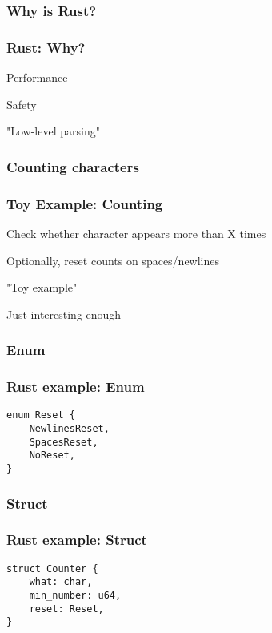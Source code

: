 \hypertarget{why-is-rust}{%
\subsubsection{Why is Rust?}\label{why-is-rust}}

\begin{frame}
\frametitle{Rust: Why?}

\pause

Performance \pause

Safety \pause

"Low-level parsing"

\end{frame}

\hypertarget{counting-characters}{%
\subsubsection{Counting characters}\label{counting-characters}}

\begin{frame}
\frametitle{Toy Example: Counting}

\pause

Check whether character appears more than X times \pause

Optionally, reset counts on spaces/newlines \pause

"Toy example" \pause

Just interesting enough

\end{frame}

\hypertarget{enum}{%
\subsubsection{Enum}\label{enum}}

\begin{frame}[fragile]
\frametitle{Rust example: Enum}

\begin{lstlisting}
enum Reset {
    NewlinesReset,
    SpacesReset,
    NoReset,
}
\end{lstlisting}
\end{frame}

\hypertarget{struct}{%
\subsubsection{Struct}\label{struct}}

\begin{frame}[fragile]
\frametitle{Rust example: Struct}

\begin{lstlisting}
struct Counter {
    what: char,
    min_number: u64,
    reset: Reset, 
}
\end{lstlisting}
\end{frame}

